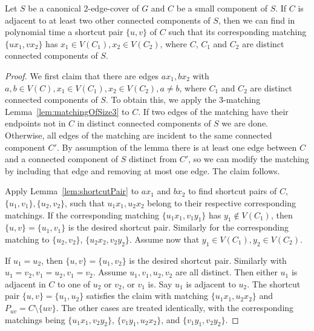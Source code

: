 \documentclass{article}
\begin{document}
\begin{corollary}\label{cor:shortcutPair}
    Let $S$ be a canonical 2-edge-cover of $G$ and $C$ be a small component of $S$. If $C$ is adjacent to at least two other connected components of $S$, then we can find in polynomial time a shortcut pair $\{u, v\}$ of $C$ such that its corresponding matching $\{ux_1, vx_2\}$ has $x_1\in V(C_1), x_2\in V(C_2)$, where $C$, $C_1$ and $C_2$ are distinct connected components of $S$.
\end{corollary}
\begin{proof}
    We first claim that there are edges $ax_1, bx_2$ with $a, b\in V(C), x_1\in V(C_1), x_2\in V(C_2), a\neq b$, where $C_1$ and $C_2$ are distinct connected components of $S$. To obtain this, we apply the 3-matching Lemma~\ref{lem:matchingOfSize3} to $C$. If two edges of the matching have their endpoints not in $C$ in distinct connected components of $S$ we are done. Otherwise, all edges of the matching are incident to the same connected component $C'$. By assumption of the lemma there is at least one edge between $C$ and a connected component of $S$ distinct from $C'$, so we can modify the matching by including that edge and removing at most one edge. The claim follows. 
    
    Apply Lemma~\ref{lem:shortcutPair} to $ax_1$ and $bx_2$ to find shortcut pairs of $C$, $\{u_1, v_1\}, \{u_2, v_2\}$, such that $u_1x_1, u_2x_2$ belong to their respective corresponding matchings. If the corresponding matching $\{u_1x_1, v_1y_1\}$ has $y_1\notin V(C_1)$, then $\{u, v\}=\{u_1, v_1\}$ is the desired shortcut pair. Similarly for the corresponding matching to $\{u_2, v_2\}$, $\{u_2x_2, v_2y_2\}$. Assume now that $y_1\in V(C_1), y_2\in V(C_2)$.
    
    If $u_1=u_2$, then $\{u, v\}=\{u_1, v_2\}$ is the desired shortcut pair. Similarly with $u_1=v_2, v_1=u_2, v_1=v_2$. Assume $u_1, v_1, u_2, v_2$ are all distinct. Then either $u_1$ is adjacent in $C$ to one of $u_2$ or $v_2$, or $v_1$ is. Say $u_1$ is adjacent to $u_2$. The shortcut pair $\{u, v\}=\{u_1, u_2\}$ satisfies the claim with matching $\{u_1x_1, u_2x_2\}$ and $P_{uv}=C\setminus\{uv\}$. The other cases are treated identically, with the corresponding matchings being $\{u_1x_1, v_2y_2\}$, $\{v_1y_1, u_2x_2\}$, and $\{v_1y_1, v_2y_2\}$.
\end{proof}
\setcounter{AlgoLine}{0}
\end{document}
